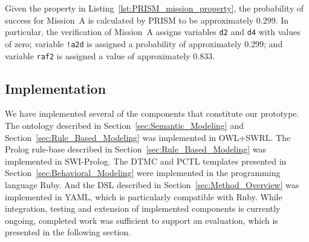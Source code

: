Given the property in Listing~\ref{lst:PRISM_mission_property}, the probability of success for Mission~A is calculated by PRISM to be approximately 0.299. In particular, the verification of Mission~A assigns variables \texttt{d2} and \texttt{d4} with values of zero; variable \texttt{!a2d} is assigned a probability of approximately 0.299; and variable \texttt{raf2} is assigned a value of approximately 0.833.

\subsection{Implementation}

\noindent We have implemented several of the components that constitute our prototype. The ontology described in Section~\ref{sec:Semantic_Modeling} and Section~\ref{sec:Rule_Based_Modeling} was implemented in OWL+SWRL\@. The Prolog rule-base described in Section~\ref{sec:Rule_Based_Modeling} was implemented in SWI-Prolog. The DTMC and PCTL templates presented in Section~\ref{sec:Behavioral_Modeling} were implemented in the programming language Ruby. And the DSL described in Section~\ref{sec:Method_Overview} was implemented in YAML, which is particularly compatible with Ruby. While integration, testing and extension of implemented components is currently ongoing, completed work was sufficient to support an evaluation, which is presented in the following section.
